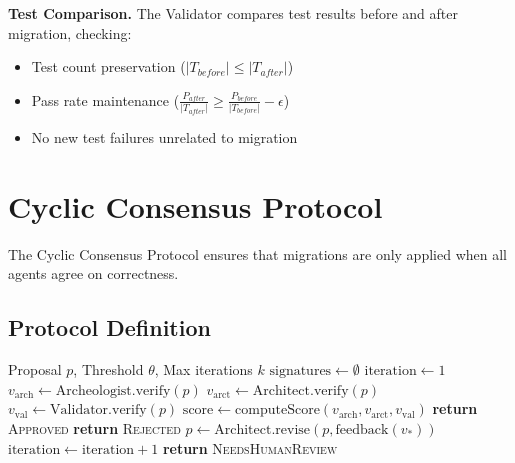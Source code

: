 \documentclass[sigconf,review,anonymous]{acmart}
\begin{document}
\textbf{Test Comparison.} The Validator compares test results before and after migration, checking:
\begin{itemize}
    \item Test count preservation ($|T_{before}| \leq |T_{after}|$)
    \item Pass rate maintenance ($\frac{P_{after}}{|T_{after}|} \geq \frac{P_{before}}{|T_{before}|} - \epsilon$)
    \item No new test failures unrelated to migration
\end{itemize}

\section{Cyclic Consensus Protocol}
\label{sec:consensus}

The Cyclic Consensus Protocol ensures that migrations are only applied when all agents agree on correctness.

\subsection{Protocol Definition}

\begin{algorithm}
\caption{Cyclic Consensus Protocol}
\label{alg:consensus}
\begin{algorithmic}[1]
\REQUIRE Proposal $p$, Threshold $\theta$, Max iterations $k$
\STATE $\text{signatures} \leftarrow \emptyset$
\STATE $\text{iteration} \leftarrow 1$
    \STATE $v_{\text{arch}} \leftarrow \text{Archeologist.verify}(p)$
    \STATE $v_{\text{arct}} \leftarrow \text{Architect.verify}(p)$  
    \STATE $v_{\text{val}} \leftarrow \text{Validator.verify}(p)$
    \STATE $\text{score} \leftarrow \text{computeScore}(v_{\text{arch}}, v_{\text{arct}}, v_{\text{val}})$
        \STATE \textbf{return} \textsc{Approved}
        \STATE \textbf{return} \textsc{Rejected}
    \ELSE
        \STATE $p \leftarrow \text{Architect.revise}(p, \text{feedback}(v_*))$
        \STATE $\text{iteration} \leftarrow \text{iteration} + 1$
    \ENDIF
\ENDWHILE
\STATE \textbf{return} \textsc{NeedsHumanReview}
\end{algorithmic}
\end{algorithm}
\end{document}
